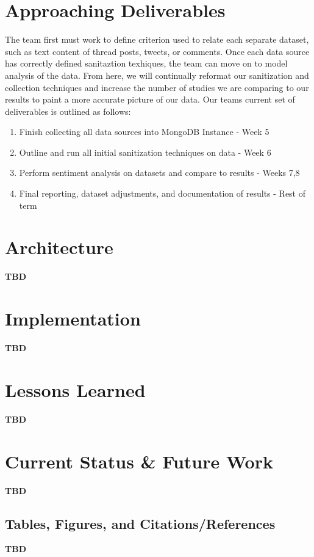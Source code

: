 \documentclass{sig-alternate}
\begin{document}
\section{Approaching Deliverables}
\label{Approaching Deliverables}

The team first must work to define criterion used to relate each separate dataset, such as text content of thread posts, tweets, or comments. Once each data source has correctly defined sanitaztion texhiques, the team can move on to model analysis of the data. From here, we will continually reformat our sanitization and collection techniques and increase the number of studies we are comparing to our results to paint a more accurate picture of our data. Our team\textsc{}s current set of deliverables is outlined as follows: 

\begin{enumerate}
\item Finish collecting all data sources into MongoDB Instance - Week 5
\item Outline and run all initial sanitization techniques on data - Week 6
\item Perform sentiment analysis on datasets and compare to results - Weeks 7,8
\item Final reporting, dataset adjustments, and documentation of results - Rest of term
\end{enumerate}

\section{Architecture}
\label{architecture}

\textbf{TBD}

\section{Implementation}
\label{implementation}

\textbf{TBD}

\section{Lessons Learned}
\label{mistakes}

\textbf{TBD}

\section{Current Status \& Future Work}
\label{current status}

\textbf{TBD}

\subsection{Tables, Figures, and Citations/References}

\textbf{TBD}



\balance
\end{document}
